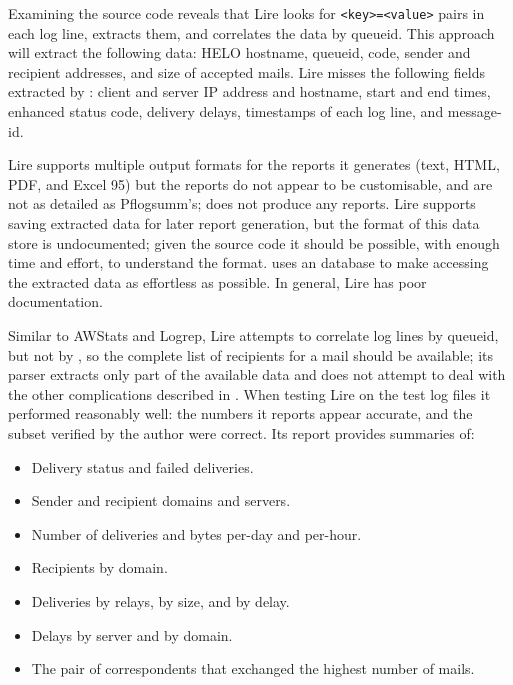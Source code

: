 Examining the source code reveals that Lire looks for
\texttt{<key>=<value>} pairs in each log line, extracts them, and
correlates the data by queueid.  This approach will extract the following
data: HELO hostname, queueid,  code, sender and recipient
addresses, and size of accepted mails.  Lire misses the following fields
extracted by \parsername{}: client and server IP address and hostname,
start and end times, enhanced status code, delivery delays, timestamps of
each log line, and message-id\@.

Lire supports multiple output formats for the reports it generates (text,
HTML, PDF, and Excel 95) but the reports do not appear to be customisable,
and are not as detailed as Pflogsumm's; \parsername{} does not produce any
reports.  Lire supports saving extracted data for later report generation,
but the format of this data store is undocumented; given the source code it
should be possible, with enough time and effort, to understand the format.
\parsername{} uses an  database to make accessing the
extracted data as effortless as possible.  In general, Lire has poor
documentation.

Similar to AWStats and Logrep, Lire attempts to correlate log lines by
queueid, but not by , so the complete list of recipients for a
mail should be available; its parser extracts only part of the available
data and does not attempt to deal with the other complications described in
.  When testing Lire on the \numberOFlogFILES{}
test log files it performed reasonably well: the numbers it reports appear
accurate, and the subset verified by the author were correct.  Its report
provides summaries of:

\begin{itemize}

    \squeezeitems{}

    \item Delivery status and failed deliveries.

    \item Sender and recipient domains and servers.

    \item Number of deliveries and bytes per-day and per-hour.

    \item Recipients by domain.

    \item Deliveries by relays, by size, and by delay.

    \item Delays by server and by domain.

    \item The pair of correspondents that exchanged the highest number of
        mails.

\end{itemize}

